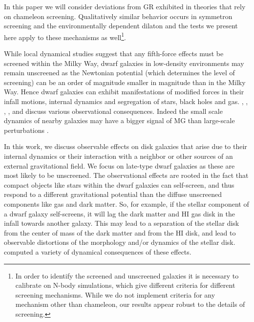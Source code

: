 \documentclass{emulateapj}
\begin{document}
In this paper we will consider deviations from GR exhibited in
theories that rely on chameleon screening.
Qualitatively similar behavior occurs in symmetron screening
\citep{hinterbichler10} and the environmentally dependent
dilaton \citep{brax10} and the tests we  present here apply
to these mechanisms as well\footnote{In order to identify the screened and
  unscreened galaxies it is necessary to calibrate on N-body simulations,
  which give different criteria for different screening mechanisms. While
  we do not implement criteria for any mechanism other than chameleon,  
  our results appear robust to the details of screening.}. 

While local dynamical studies suggest that any fifth-force effects must be
screened within the Milky Way, 
dwarf galaxies in low-density environments may remain unscreened as the 
Newtonian potential (which determines the level of screening) can be an order of
magnitude 
smaller in magnitude than in the Milky Way. Hence dwarf galaxies can
exhibit manifestations of modified forces in  their infall motions, 
internal dynamics and segregation of stars, black holes and gas. \citet{hui09}, \citet{hui10}, \citet{bhuvjake2011},
\citet{changhui}, \citet{Davis2012} and 
\citet{jainvinu2012}
discuss various observational consequences. Indeed the small scale dynamics of 
nearby galaxies may have a bigger signal of MG than large-scale perturbations 
\citep[see][for a discussion of observational approaches]{jain11}.
 
In this work, we discuss observable effects on disk galaxies that  arise due to 
their internal dynamics or their interaction with a neighbor or other sources of
an external gravitational field. We focus on late-type dwarf galaxies as these
are most likely to be unscreened. The observational effects are rooted in the
fact that compact objects like stars within
the dwarf galaxies can self-screen, and thus respond to a different
gravitational potential than the diffuse unscreened components like gas and dark matter.
So, for example, if the stellar component of a dwarf galaxy self-screens,
it will lag the dark matter and HI gas disk in the infall towards
another galaxy. This may lead to a separation of the stellar disk from the
center of mass of the dark matter and from the HI disk, and lead to
observable distortions of the morphology and/or dynamics of the stellar disk.
\citet{bhuvjake2011} computed a variety of dynamical consequences of these
effects. 
 
\end{document}
